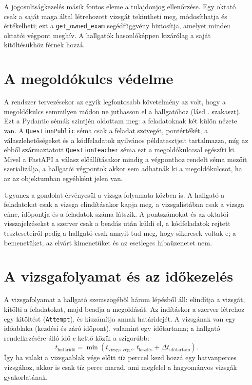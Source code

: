 A jogosultságkezelés másik fontos eleme a tulajdonjog ellenőrzése. Egy oktató csak a saját
maga által létrehozott vizsgát tekintheti meg, módosíthatja és értékelheti; ezt a
\texttt{get\_owned\_exam} segédfüggvény biztosítja, amelyet minden oktatói végpont meghív.
A hallgatók hasonlóképpen kizárólag a saját kitöltésükhöz férnek hozzá.

\section{A megoldókulcs védelme}

A rendszer tervezésekor az egyik legfontosabb követelmény az volt, hogy a megoldókulcs semmilyen
módon ne juthasson el a hallgatóhoz (lásd . szakaszt). Ezt a Pydantic
sémák szintjén oldottam meg: a feladatoknak két külön nézete van. A \texttt{QuestionPublic}
séma csak a feladat szövegét, pontértékét, a válaszlehetőségeket és a kódfeladatok nyilvános
példatesztjeit tartalmazza, míg az ebből származtatott \texttt{QuestionTeacher} séma ezt a
megoldókulccsal egészíti ki. Mivel a FastAPI a válasz előállításakor mindig a végponthoz rendelt
séma mezőit szerializálja, a hallgatói végpontok akkor sem adhatnák ki a megoldókulcsot, ha az
az objektumban egyébként jelen van.

Ugyanez a gondolat érvényesül a vizsga folyamata közben is. A hallgató a feladatokat csak a vizsga
elindításakor kapja meg, a vizsgalistában csak a vizsga címe, időpontja és a feladatok száma
látszik. A pontszámokat és az oktatói visszajelzéseket a szerver csak a beadás után küldi el, a
kódfeladatok rejtett teszteseteiről pedig a hallgató csak annyit tud meg, hogy sikeresek voltak-e;
a bemenetüket, az elvárt kimenetüket és az esetleges hibaüzenetet nem.

\section{A vizsgafolyamat és az időkezelés}

A vizsgafolyamat a hallgató szemszögéből három lépésből áll: elindítja a vizsgát, kitölti a
feladatokat, majd beadja a megoldását. Az indításkor a szerver létrehoz egy kitöltést
(\texttt{Attempt}), és kiszámítja annak határidejét. A vizsgának van egy időablaka (kezdési és
záró időpont), valamint egy időtartama; a hallgató rendelkezésére álló idő e kettő közül a
szigorúbb:
\begin{equation}
  t_{\text{határidő}} = \min\left(t_{\text{vizsga vége}},\ t_{\text{kezdés}} + \Delta t_{\text{időtartam}}\right).
  \label{eq:hatarido}
\end{equation}
Így ha valaki a vizsgaablak vége előtt tíz perccel kezd hozzá egy hatvanperces vizsgához, akkor
is csak tíz perce marad, ami megfelel a hagyományos vizsgák gyakorlatának.

